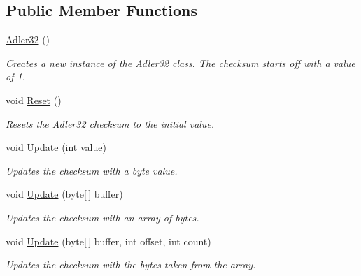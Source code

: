 \subsection*{Public Member Functions}
\begin{DoxyCompactItemize}
\item 
\hyperlink{class_i_c_sharp_code_1_1_sharp_zip_lib_1_1_checksums_1_1_adler32_a972862f4f9c1bad593b4da0318299279}{Adler32} ()
\begin{DoxyCompactList}\small\item\em Creates a new instance of the \hyperlink{class_i_c_sharp_code_1_1_sharp_zip_lib_1_1_checksums_1_1_adler32}{Adler32} class. The checksum starts off with a value of 1. \end{DoxyCompactList}\item 
void \hyperlink{class_i_c_sharp_code_1_1_sharp_zip_lib_1_1_checksums_1_1_adler32_ab508a341e82f164dfbb744188614caeb}{Reset} ()
\begin{DoxyCompactList}\small\item\em Resets the \hyperlink{class_i_c_sharp_code_1_1_sharp_zip_lib_1_1_checksums_1_1_adler32}{Adler32} checksum to the initial value. \end{DoxyCompactList}\item 
void \hyperlink{class_i_c_sharp_code_1_1_sharp_zip_lib_1_1_checksums_1_1_adler32_ae37b99f42678909be303136f2995b572}{Update} (int value)
\begin{DoxyCompactList}\small\item\em Updates the checksum with a byte value. \end{DoxyCompactList}\item 
void \hyperlink{class_i_c_sharp_code_1_1_sharp_zip_lib_1_1_checksums_1_1_adler32_a37a55dd34c64e5b9ea40ef50a6e23afd}{Update} (byte\mbox{[}$\,$\mbox{]} buffer)
\begin{DoxyCompactList}\small\item\em Updates the checksum with an array of bytes. \end{DoxyCompactList}\item 
void \hyperlink{class_i_c_sharp_code_1_1_sharp_zip_lib_1_1_checksums_1_1_adler32_ad1fb412ee9a03ff079da149d0c06d0f6}{Update} (byte\mbox{[}$\,$\mbox{]} buffer, int offset, int count)
\begin{DoxyCompactList}\small\item\em Updates the checksum with the bytes taken from the array. \end{DoxyCompactList}\item 

\end{DoxyCompactItemize}
